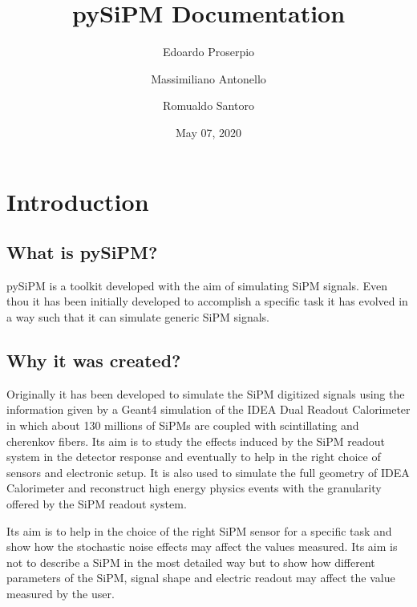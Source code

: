 \documentclass[letterpaper,10pt,english]{sphinxmanual}
\title{pySiPM Documentation}
\date{May 07, 2020}
\author{Edoardo Proserpio\and Massimiliano Antonello\and Romualdo Santoro}
\begin{document}
\pagestyle{empty}
\sphinxmaketitle
\pagestyle{plain}
\sphinxtableofcontents
\pagestyle{normal}
\label{\detokenize{index::doc}}



\chapter{Introduction}
\label{\detokenize{introduction:introduction}}\label{\detokenize{introduction::doc}}

\section{What is pySiPM?}
\label{\detokenize{introduction:what-is-pysipm}}
pySiPM is a toolkit developed with the aim of simulating SiPM signals.
Even thou it has been initially developed to accomplish a specific task it has evolved in a way such that it can simulate generic SiPM signals.


\section{Why it was created?}
\label{\detokenize{introduction:why-it-was-created}}
Originally it has been developed to simulate the SiPM digitized signals using the information given by a Geant4 simulation of the IDEA Dual Readout Calorimeter in which about 130 millions of SiPMs are coupled with scintillating and cherenkov fibers.
Its aim is to study the effects induced by the SiPM readout system in the detector response and eventually to help in the right choice of sensors and electronic setup.
It is also used to simulate the full geometry of IDEA Calorimeter and reconstruct high energy physics events with the granularity offered by the SiPM readout system.

Its aim is to help in the choice of the right SiPM sensor for a specific task and show how the stochastic noise effects may affect the values measured. Its aim is not to describe a SiPM in the most detailed way but to show how different parameters of the SiPM, signal shape and electric readout may affect the value measured by the user.
\end{document}
